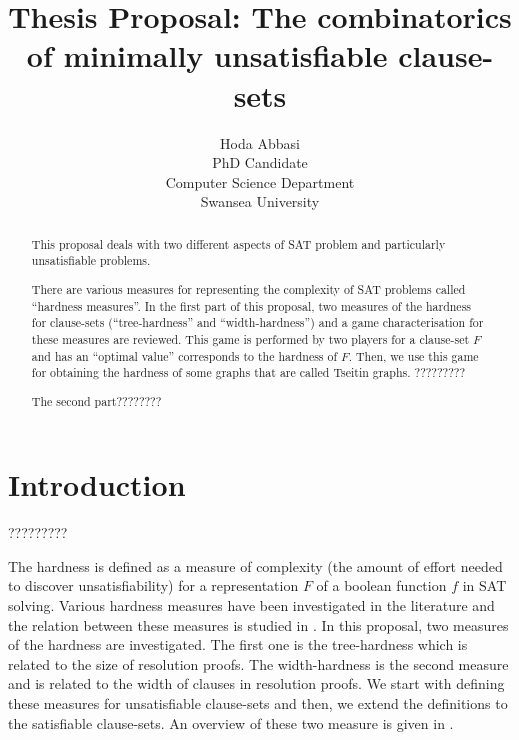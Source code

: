 \documentclass{report}
\begin{document}
\title{Thesis Proposal: The combinatorics of minimally unsatisfiable clause-sets
       }

\author{Hoda Abbasi\\
        PhD Candidate\\
        Computer Science Department\\
        Swansea University\\}
\maketitle


\begin{abstract}
This proposal deals with two different aspects of SAT problem and particularly unsatisfiable problems. 

There are various measures for representing the complexity of SAT problems called ``hardness measures''. In the first part of this proposal, two measures of the hardness for clause-sets (``tree-hardness'' and ``width-hardness'') and a game characterisation for these measures are reviewed. This game is performed by two players for a clause-set $F$ and has an ``optimal value'' corresponds to the hardness of $F$. Then, we use this game for obtaining the hardness of some graphs that are called Tseitin graphs. ?????????

The second part????????

\end{abstract}

\tableofcontents
\chapter{Introduction}
\label{cha:intro}

?????????

The hardness is defined as a measure of complexity (the amount of effort needed to discover unsatisfiability) for a representation $F$ of a boolean function $f$ in SAT solving. Various hardness measures have been investigated in the literature and the relation between these measures is studied in \cite{BeyersdorffGwynneKullmann2013PHPER,BeyersdorffKullmann2014PHP,GwynneKullmann2013GoodRepresentationsIIex}. In this proposal, two measures of the hardness are investigated. The first one is the tree-hardness which is related to the size of resolution proofs. The width-hardness is the second measure and is related to the width of clauses in resolution proofs. We start with defining these measures for unsatisfiable clause-sets and then, we extend the definitions to the satisfiable clause-sets. An overview of these two measure is given in \cite{BeyersdorffGwynneKullmann2013PHPER,BeyersdorffKullmann2014PHP,?? }.
\end{document}
